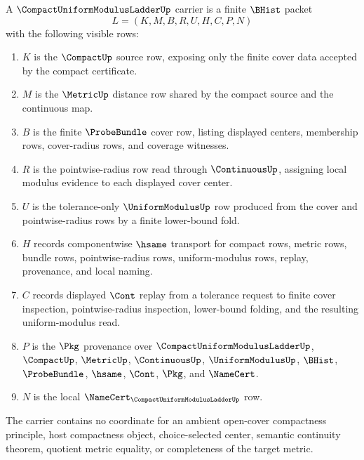 \begin{definition}
\label{def:compact-uniform-modulus-ladder-carrier}
A $\CompactUniformModulusLadderUp$ carrier is a finite $\BHist$ packet
$$
L=(K,M,B,R,U,H,C,P,N)
$$
with the following visible rows:
\begin{enumerate}
\item $K$ is the $\CompactUp$ source row, exposing only the finite cover data accepted by the compact certificate.
\item $M$ is the $\MetricUp$ distance row shared by the compact source and the continuous map.
\item $B$ is the finite $\ProbeBundle$ cover row, listing displayed centers, membership rows, cover-radius rows, and coverage witnesses.
\item $R$ is the pointwise-radius row read through $\ContinuousUp$, assigning local modulus evidence to each displayed cover center.
\item $U$ is the tolerance-only $\UniformModulusUp$ row produced from the cover and pointwise-radius rows by a finite lower-bound fold.
\item $H$ records componentwise $\hsame$ transport for compact rows, metric rows, bundle rows, pointwise-radius rows, uniform-modulus rows, replay, provenance, and local naming.
\item $C$ records displayed $\Cont$ replay from a tolerance request to finite cover inspection, pointwise-radius inspection, lower-bound folding, and the resulting uniform-modulus read.
\item $P$ is the $\Pkg$ provenance over $\CompactUniformModulusLadderUp$, $\CompactUp$, $\MetricUp$, $\ContinuousUp$, $\UniformModulusUp$, $\BHist$, $\ProbeBundle$, $\hsame$, $\Cont$, $\Pkg$, and $\NameCert$.
\item $N$ is the local $\NameCert_{\CompactUniformModulusLadderUp}$ row.
\end{enumerate}
The carrier contains no coordinate for an ambient open-cover compactness principle, host compactness object, choice-selected center, semantic continuity theorem, quotient metric equality, or completeness of the target metric.
\end{definition}

